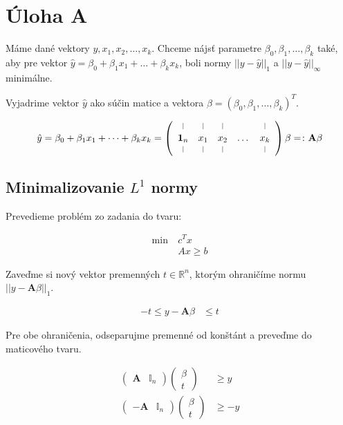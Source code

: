 \documentclass[12pt,oneside,a4paper,slovak]{article}
\newcommand*{\vertbar}{\rule[0ex]{0.3pt}{1.5ex}}
\begin{document}
   

\section*{Úloha A}

Máme dané vektory $y, x_1, x_2, \dots, x_k$. Chceme nájsť parametre $\beta_0, \beta_1,\dots,\beta_k$ také, aby pre vektor $\hat{y} = \beta_0 + \beta_1x_1 + \dots + \beta_kx_k$, boli normy $||y - \hat{y}||_1$ a $||y - \hat{y}||_{\infty}$ minimálne. 

Vyjadrime vektor $\hat{y}$ ako súčin matice a vektora $\beta = (\beta_0, \beta_1, \dots, \beta_k)^T$.

\begin{align*}
	\hat{y} = \beta_0 + \beta_1x_1 + \dots + \beta_kx_k = 
	\left(
		\begin{array}{ccccc}
			\vertbar & \vertbar & \vertbar &  & \vertbar \\
			\mathbf{1}_n & x_1 & x_2 & \dots & x_k \\
			\vertbar & \vertbar & \vertbar &  & \vertbar
		\end{array}
	\right)
	\beta
	=\colon
	\mathbf{A} \beta
\end{align*}

\subsection*{Minimalizovanie $L^1$ normy}

Prevedieme problém zo zadania do tvaru:

\begin{align*}
	\text{min}~ &c^Tx\\
	&Ax \geq b
\end{align*}

Zaveďme si nový vektor premenných $t \in \mathbb{R}^n$, ktorým ohraničíme normu $||y - \mathbf{A} \beta||_1$.

\begin{align*}
	-t \leq y - \mathbf{A} \beta &\leq t
\end{align*}	

Pre obe ohraničenia, odseparujme premenné od konštánt a preveďme do maticového tvaru.

\begin{align*}
	\left(
		\begin{array}{c|c}
			\mathbf{A} & \mathbb{I}_n
		\end{array}
	\right)
	\left(
		\begin{array}{c}
			\beta \\
			\hline
			t
		\end{array}
	\right) &\geq y \\
	\left(
		\begin{array}{c|c}
			-\mathbf{A} & \mathbb{I}_n
		\end{array}
	\right)
	\left(
		\begin{array}{c}
			\beta \\
			\hline
			t
		\end{array}
	\right) &\geq -y
\end{align*}
\end{document}
